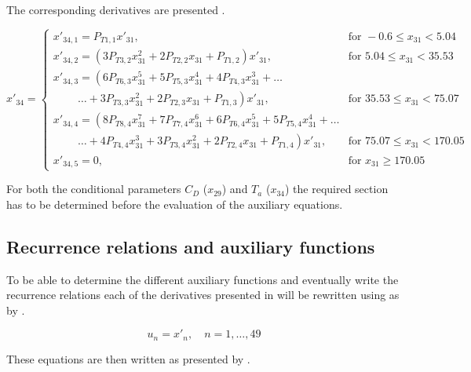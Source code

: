 The corresponding derivatives are presented .

\begin{equation}\label{eq:TCondDerAux}
x'_{34}=\begin{cases}
x'_{34,1}=P_{T 1,1}x'_{31}, & \text{for } -0.6 \leq x_{31} < 5.04  \\
x'_{34,2}=\left(3P_{T 3,2}x_{31}^{2}+2P_{T 2,2}x_{31}+P_{T 1,2}\right)x'_{31}, &  \text{for } 5.04\leq x_{31} < 35.53   \\
x'_{34,3}=\left(6 P_{T 6,3}x_{31}^{5}+5P_{T 5,3}x_{31}^{4}+4P_{T 4,3}x_{31}^{3}+ \dots
\right. \\
\qquad\  \left. \dotsc +3P_{T 3,3}x_{31}^{2}+2P_{T 2,3}x_{31}+P_{T 1,3}\right)x'_{31}, &  \text{for } 35.53\leq x_{31} < 75.07   \\
x'_{34,4}=\left(8 P_{T 8,4}x_{31}^{7}+7P_{T 7,4}x_{31}^{6}+6P_{T 6,4}x_{31}^{5}
+5P_{T 5,4}x_{31}^{4}+ \dots \right. \\
\qquad\  \left. \dotsc +4P_{T 4,4}x_{31}^{3}+3P_{T 3,4}x_{31}^{2}+2P_{T 2,4}x_{31}+P_{T 1,4}\right)x'_{31}, &  \text{for } 75.07\leq x_{31} < 170.05   \\
x'_{34,5}=0, &  \text{for }  x_{31} \geq 170.05   
\end{cases}
\end{equation}


For both the conditional parameters $C_{D}$ ($x_{29}$) and $T_{a}$ ($x_{34}$) the required section has to be determined before the evaluation of the auxiliary equations. 

\subsection{Recurrence relations and auxiliary functions}
\label{subsec:recRelAuxFunc}
To be able to determine the different auxiliary functions and eventually write the recurrence relations each of the derivatives presented in  will be rewritten using  as by \cite{scott2008high}. 

\begin{equation} \label{eq:un}
u_{n}=x'_{n}, \quad n=1,\dotsc,49
\end{equation}

These equations are then written as presented by .

